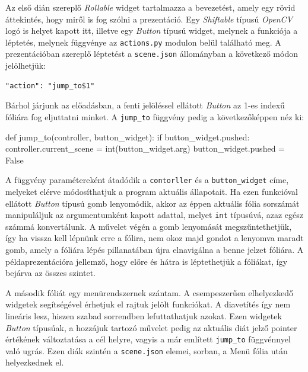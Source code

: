 Az első dián szereplő \textit{Rollable} widget tartalmazza a bevezetést, amely egy rövid áttekintés, hogy miről is fog szólni a prezentáció. Egy \textit{Shiftable} típusú \textit{OpenCV} logó is helyet kapott itt, illetve egy \textit{Button} típusú widget, melynek a funkciója a léptetés, melynek függvénye az \texttt{actions.py} modulon belül található meg. A prezentációban szereplő léptetést a \texttt{scene.json} állományban a következő módon jelölhetjük:
\begin{verbatim}
"action": "jump_to$1"
\end{verbatim}
Bárhol járjunk az előadásban, a fenti jelöléssel ellátott \textit{Button} az 1-es indexű fóliára fog eljuttatni minket. A \texttt{jump\_to} függvény pedig a következőképpen néz ki:
\begin{python}
def jump_to(controller, button_widget):
    if button_widget.pushed:
        controller.current_scene = int(button_widget.arg)
        button_widget.pushed = False
\end{python}
A függvény paramétereként átadódik a \texttt{contorller} és a \texttt{button\_widget} címe, melyeket elérve módosíthatjuk a program aktuális állapotait. Ha ezen funkcióval ellátott \textit{Button} típusú gomb lenyomódik, akkor az éppen aktuális fólia sorszámát manipuláljuk az argumentumként kapott adattal, melyet \texttt{int} típusúvá, azaz egész számmá konvertálunk. A művelet végén a gomb lenyomását megszűntethetjük, így ha vissza kell lépnünk erre a fólira, nem okoz majd gondot a lenyomva maradt gomb, amely a fóliára lépés pillanatában újra elnavigálna a benne jelzet fóliára.
A példaprezentációra jellemző, hogy előre és hátra is léptethetjük a fóliákat, így bejárva az összes szintet.

A második fóliát egy menürendszernek szántam. A csempeszerűen elhelyezkedő widgetek segítségével érhetjuk el rajtuk jelölt funkciókat. A diavetítés így nem lineáris lesz, hiszen szabad sorrendben lefuttathatjuk azokat. Ezen widgetek \textit{Button} típusúak, a hozzájuk tartozó művelet pedig az aktuális diát jelző pointer értékének változtatása a cél helyre, vagyis a már említett \texttt{jump\_to} függvénnyel való ugrás. Ezen diák szintén a \texttt{scene.json} elemei, sorban, a Menü fólia után helyezkednek el.

